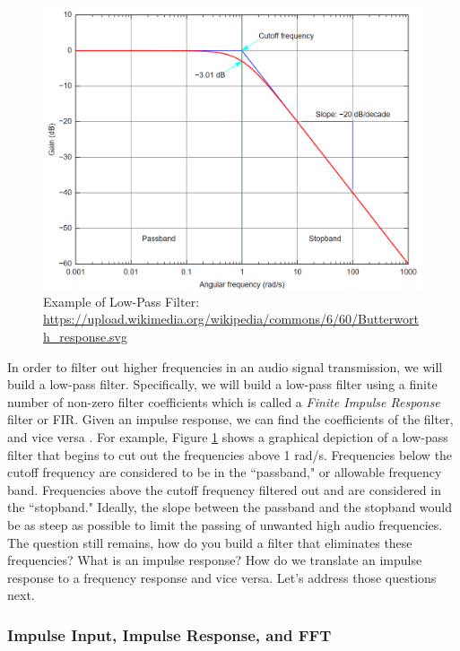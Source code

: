 \begin{figure}[h!]
	\centering
	\includegraphics[scale = .5]{images/low_pass.png} %
	\caption{Example of Low-Pass Filter: \url{https://upload.wikimedia.org/wikipedia/commons/6/60/Butterworth_response.svg}}
	\label{fig:lowpass}
\end{figure}    

In order to filter out higher frequencies in an audio signal
transmission, we will build a low-pass filter. Specifically, we
will build a low-pass filter using a finite number of non-zero
filter coefficients which is called a \textit{Finite Impulse
Response} filter or FIR. Given an impulse response, we can find
the coefficients of the filter, and vice versa
\cite{notes:class}. For example, Figure \ref{fig:lowpass} shows a
graphical depiction of a low-pass filter that begins to cut out
the frequencies above 1 rad/s. Frequencies below the cutoff
frequency are considered to be in the
``passband," or allowable frequency band.  Frequencies above the cutoff frequency filtered out and are considered in the ``stopband."
Ideally, the slope between the passband and the stopband would be
as steep as possible to limit the passing of unwanted high audio
frequencies. The question still remains, how do you build a
filter that eliminates these frequencies? What is an impulse
response? How do we translate an impulse response to a frequency
response and vice versa. Let's address those questions next.

\subsubsection{Impulse Input, Impulse Response, and FFT}

